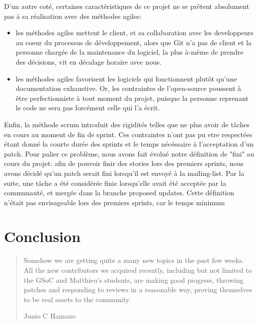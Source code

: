 \documentclass[a4paper, 12pt]{article}
\begin{document}
D'un autre coté, certaines caractéristiques de ce projet ne se prêtent absolument pas à sa réalisation avec des méthodes agiles:
\begin{itemize}
\item les méthodes agiles mettent le client, et sa collaboration avec les developpeurs au coeur du processus de développement, alors que Git n'a pas de client et la personne chargée de la maintenance du logiciel, la plus à-même de prendre des décisions, vit en décalage horaire avec nous.
\item les méthodes agiles favorisent les logiciels qui fonctionnent plutôt qu'une documentation exhaustive.
Or, les contraintes de l'open-source poussent à être perfectionniste à tout moment du projet, puisque la personne reprenant le code ne sera pas forcément celle qui l'a écrit.
\end{itemize}

Enfin, la méthode scrum introduit des rigidités telles que ne plus avoir de tâches en cours au moment de fin de sprint.
Ces contraintes n'ont pas pu etre respectées étant donné la courte durée des sprints et le temps nécéssaire à l'acceptation d'un patch.
Pour palier ce problème, nous avons fait évolué notre définition de "fini" au cours du projet: afin de pouvoir finir des stories lors des premiers sprints, nous avons décidé qu'un patch serait fini lorsqu'il est envoyé à la mailing-list.
Par la suite, une tâche a été considérée finie lorsqu'elle avait été acceptée par la communauté, et mergée dans la branche proposed updates.
Cette définition n'était pas envisageable lors des premiers sprints, car le temps minimum 

\section{Conclusion}

\begin{quote} 
   Somehow we are getting quite a many new topics in the past few
weeks.  All the new contributors we acquired recently, including but not limited to the GSoC and Matthieu's students, are making good progress, throwing patches and responding to reviews in a reasonable way, proving themselves to be real assets to the community.
   \begin{flushright}
      Junio C Hamano
   \end{flushright}
\end{quote}
\end{document}
